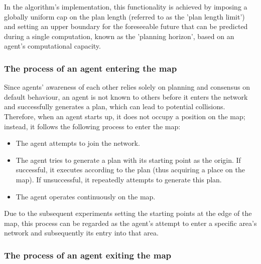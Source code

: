 In the algorithm's implementation, this functionality is achieved by imposing a globally uniform cap on the plan length (referred to as the 'plan length limit') and setting an upper boundary for the foreseeable future that can be predicted during a single computation, known as the 'planning horizon', based on an agent's computational capacity.

\subsubsection{The process of an agent entering the map}
\label{chap:join map}

Since agents' awareness of each other relies solely on planning and consensus on default behaviour, an agent is not known to others before it enters the network and successfully generates a plan, which can lead to potential collisions. Therefore, when an agent starts up, it does not occupy a position on the map; instead, it follows the following process to enter the map:

\begin{itemize}
    \item The agent attempts to join the network.
    \item The agent tries to generate a plan with its starting point as the origin. If successful, it executes according to the plan (thus acquiring a place on the map). If unsuccessful, it repeatedly attempts to generate this plan.
    \item The agent operates continuously on the map.
\end{itemize}

Due to the subsequent experiments setting the starting points at the edge of the map, this process can be regarded as the agent's attempt to enter a specific area's network and subsequently its entry into that area.

\subsubsection{The process of an agent exiting the map}
\label{chap:exit map}

